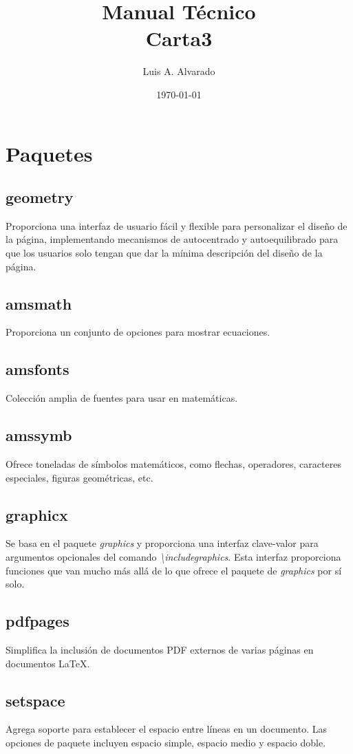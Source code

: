 \documentclass[12pt]{article}
\title{Manual Técnico \\ Carta3}
\author{Luis A. Alvarado}
\date{\today}
\begin{document}
\maketitle{}

\tableofcontents

\clearpage
\newpage

\section{Paquetes}
\subsection{geometry}
Proporciona una interfaz de usuario fácil y flexible para personalizar el diseño de la página, implementando mecanismos de autocentrado y autoequilibrado para que los usuarios solo tengan que dar la mínima descripción del diseño de la página.\cite{geometry}
\subsection{amsmath}
Proporciona un conjunto de opciones para mostrar ecuaciones. \cite{amsmath}
\subsection{amsfonts}
Colección amplia de fuentes para usar en matemáticas. \cite{amsfonts}
\subsection{amssymb}
Ofrece toneladas de símbolos matemáticos, como flechas, operadores, caracteres especiales, figuras geométricas, etc. \cite{amssymb}
\subsection{graphicx}
Se basa en el paquete \textit{graphics} y proporciona una interfaz clave-valor para argumentos opcionales del comando \textit{\textbackslash includegraphics}. Esta interfaz proporciona funciones que van mucho más allá de lo que ofrece el paquete de \textit{graphics} por sí solo. \cite{graphicx}
\subsection{pdfpages}
Simplifica la inclusión de documentos PDF externos de varias páginas en documentos \LaTeX.\cite{pdfpages}
\subsection{setspace}
Agrega soporte para establecer el espacio entre líneas en un documento. Las opciones de paquete incluyen espacio simple, espacio medio y espacio doble. \cite{setspace}
\end{document}
